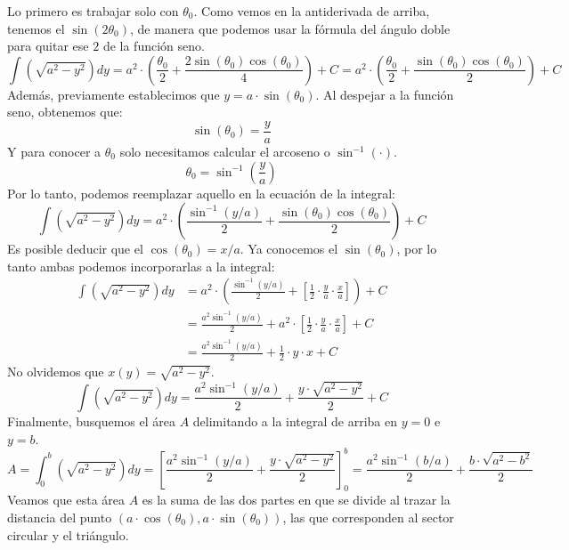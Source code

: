\documentclass[12pt]{article}
\begin{document}
Lo primero es trabajar solo con $\theta_{0}$. Como vemos en la antiderivada de arriba, tenemos el $\sin(2\theta_{0})$, de manera que podemos usar la fórmula del ángulo doble para quitar ese $2$ de la función seno.
\[
  \int \left(\sqrt{a^{2} - y^{2}}\right) dy = a^{2} \cdot
                                              \left(\frac{\theta_{0}}{2} + \frac{2\sin(\theta_{0})\cos(\theta_{0})}{4}\right) + C
                                            = a^{2} \cdot
                                              \left(\frac{\theta_{0}}{2} + \frac{\sin(\theta_{0})\cos(\theta_{0})}{2}\right) + C
\]
Además, previamente establecimos que $y = a \cdot \sin(\theta_{0})$. Al despejar a la función seno, obtenemos que:
\[
  \sin(\theta_{0}) = \frac{y}{a}
\]
Y para conocer a $\theta_{0}$ solo necesitamos calcular el arcoseno o $\sin^{-1}(\cdot)$.
\[
  \theta_{0} = \sin^{-1}\left(\frac{y}{a}\right)
\]
Por lo tanto, podemos reemplazar aquello en la ecuación de la integral:
\[
\int \left(\sqrt{a^{2} - y^{2}}\right) dy = a^{2} \cdot
                                            \left(\frac{\sin^{-1}(y/a)}{2} + \frac{\sin(\theta_{0})\cos(\theta_{0})}{2}\right) + C
\]
Es posible deducir que el $\cos(\theta_{0}) = x/a$. Ya conocemos el $\sin(\theta_{0})$, por lo tanto ambas podemos incorporarlas a la integral:
\begin{align*}
\int \left(\sqrt{a^{2} - y^{2}}\right) dy &= a^{2} \cdot
                                            \left(
                                              \frac{\sin^{-1}(y/a)}{2} + \left[\frac{1}{2} \cdot \frac{y}{a} \cdot \frac{x}{a}\right]
                                            \right)
                                            + C \\
                                          &= \frac{a^{2}\sin^{-1}(y/a)}{2} +
                                            a^{2} \cdot \left[\frac{1}{2} \cdot \frac{y}{a} \cdot \frac{x}{a}\right] + C \\
                                          &= \frac{a^{2}\sin^{-1}(y/a)}{2} + \frac{1}{2} \cdot y \cdot x + C
\end{align*}
No olvidemos que $x(y) = \sqrt{a^{2} - y^{2}}$.
\[
  \int \left(\sqrt{a^{2} - y^{2}}\right) dy = \frac{a^{2}\sin^{-1}(y/a)}{2} + \frac{y \cdot \sqrt{a^{2} - y^{2}}}{2} + C
\]
Finalmente, busquemos el área $A$ delimitando a la integral de arriba en $y = 0$ e $y = b$.
\[
  A = \int_{0}^{b} \left(\sqrt{a^{2} - y^{2}}\right) dy
    = \left[\frac{a^{2}\sin^{-1}(y/a)}{2} + \frac{y \cdot \sqrt{a^{2} - y^{2}}}{2}\right]_{0}^{b}
    = \frac{a^{2}\sin^{-1}(b/a)}{2} + \frac{b \cdot \sqrt{a^{2} - b^{2}}}{2}
\]
Veamos que esta área $A$ es la suma de las dos partes en que se divide al trazar la distancia del punto $(a \cdot \cos(\theta_{0}), a \cdot \sin(\theta_{0}))$, las que corresponden al sector circular y el triángulo.
\end{document}
